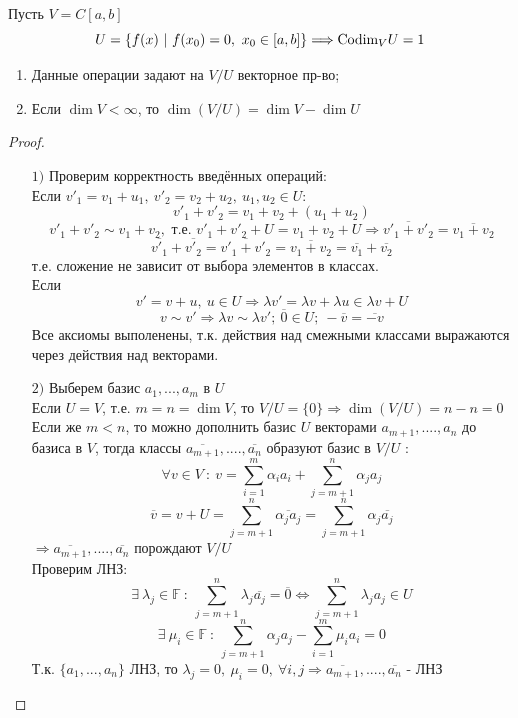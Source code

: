     \begin{example1}
        Пусть $V = C[a, b]$ 
        $$U = \{f(x) \ | \ f(x_0) = 0, \ x_0 \in [a, b]\} \Longrightarrow \textup{Codim}_{V} U = 1$$
    \end{example1}
    \begin{theorem} \tab
        \begin{enumerate}
            \item Данные операции задают на $V/U$ векторное пр-во;
            \item Если $\dim V < \infty$, то $\dim(V/U) = \dim V - \dim U$
        \end{enumerate}
    \end{theorem}
    \begin{proof} \tab
        \begin{itemize}
            \item[$1)$] Проверим корректность введённых операций:\\
            Если $v'_1 = v_1 + u_1, \ v'_2 = v_2 + u_2, \ u_1, u_2\in U: $ 
            $$v'_1 + v'_2 = v_1 + v_2 + (u_1 + u_2)$$
            $$ v'_1 + v'_2 \sim v_1 + v_2, \text{ т.е. } v'_1 + v'_2 + U = v_1 + v_2 + U \Rightarrow \overline{v'_1 + v'_2} = \overline{v_1 + v_2}$$
            $$\overline{v'_1} + \overline{v'_2} = \overline{v'_1 + v'_2} = \overline{v_1 + v_2} = \overline{v_1} + \overline{v_2}$$
            т.е. сложение не зависит от выбора элементов в классах.\\
            Если 
            $$v' = v + u, \ u \in U \Longrightarrow \lambda v' = \lambda v + \lambda u \in \lambda v + U$$ 
            $$v \sim v' \Longrightarrow \lambda v \sim \lambda v'; \ \overline{0} \in U; \  -\overline{v} = \overline{-v}$$
            Все аксиомы выполенены, т.к. действия над смежными классами выражаются через действия над векторами.
            \item[$2)$] Выберем базис $a_1,...,a_m$ в $U$\\
            Если $U=V$, т.е. $m=n=\dim V$, то $V/U = \{0\} \Longrightarrow \dim (V/U) = n-n=0$\\
            Если же $m<n$, то можно дополнить базис $U$ векторами $a_{m+1},....,a_n$ до базиса в $V$, тогда классы $\overline{a_{m+1}},....,\overline{a_n}$ образуют базис в $V/U$ :
            $$\forall v \in V \ : \ v = \sum \limits_{i=1}^m \alpha_i a_i + \sum \limits_{j=m+1}^n \alpha_j a_j$$
            $$\overline{v} = v+ U = \sum \limits_{j=m+1}^n \overline{\alpha_j a_j} = \sum \limits_{j=m+1}^n \alpha_j \overline{ a_j}$$
            $\Longrightarrow \overline{a_{m+1}},....,\overline{a_n}$ порождают $V/U$\\
            Проверим ЛНЗ: 
            $$\exists \ \lambda_j \in \mathbb{F} \ : \ \sum \limits_{j=m+1}^n \lambda_j \overline{ a_j} = \overline{0} \Longleftrightarrow  \sum \limits_{j=m+1}^n \lambda_j a_j \in U$$
            $$\exists \ \mu_i \in \mathbb{F} \ : \ \sum \limits_{j=m+1}^n \alpha_j a_j - \sum \limits_{i=1}^m \mu_i a_i = 0$$
            Т.к. $\{a_1,...,a_n\}$ ЛНЗ, то $\lambda_j =0, \ \mu_i =0 , \ \forall i,j \Longrightarrow \overline{a_{m+1}},....,\overline{a_n}$ - ЛНЗ   
        \end{itemize}
    \end{proof}